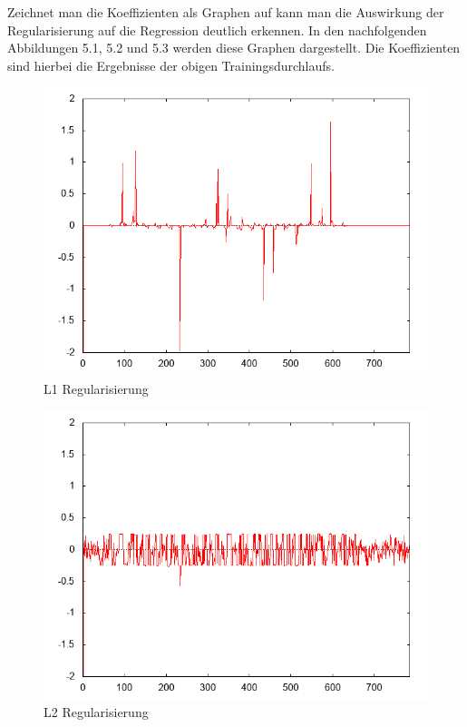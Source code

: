 Zeichnet man die Koeffizienten als Graphen auf kann man die Auswirkung der Regularisierung auf die Regression deutlich erkennen. In den nachfolgenden Abbildungen 5.1, 5.2 und 5.3 werden diese Graphen dargestellt. Die Koeffizienten sind hierbei die Ergebnisse der obigen Trainingsdurchlaufs.
\begin{figure}[ht]
\centering
  	\includegraphics[scale=0.5]{bilder/features7}
  	\caption{L1 Regularisierung}
\end{figure}
\begin{figure}[ht]
\centering
  	\includegraphics[scale=0.5]{bilder/features2}
	\caption{L2 Regularisierung}
\end{figure}
